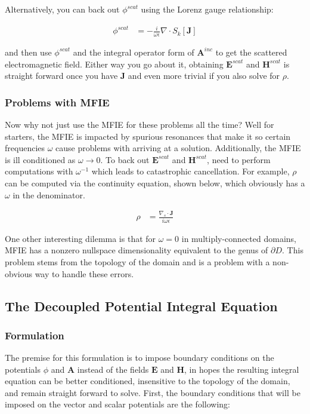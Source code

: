 \documentclass{article}[12pt]
\newcommand{\bvec}[1]{\boldsymbol{#1}}
\begin{document}
	Alternatively, you can back out $\phi^{scat}$ using the Lorenz gauge relationship:
	
	\begin{align*}
	\phi^{scat} &= -\frac{i}{\omega \epsilon} \nabla \cdot S_k[\bvec{J}]
	\end{align*} 
	
	and then use $\phi^{scat}$ and the integral operator form of $\bvec{A}^{inc}$ to get the scattered electromagnetic field. Either way you go about it, obtaining $\bvec{E}^{scat}$ and $\bvec{H}^{scat}$ is straight forward once you have $\bvec{J}$ and even more trivial if you also solve for $\rho$.
	
	


	
	\subsubsection{Problems with MFIE}
	Now why not just use the MFIE for these problems all the time? Well for starters, the MFIE is impacted by spurious resonances that make it so certain frequencies $\omega$ cause problems with arriving at a solution. Additionally, the MFIE is ill conditioned as $\omega \rightarrow 0$. To back out $\bvec{E}^{scat}$ and $\bvec{H}^{scat}$, need to perform computations with $\omega^{-1}$ which leads to catastrophic cancellation. For example, $\rho$ can be computed via the continuity equation, shown below, which obviously has a $\omega$ in the denominator.
	
	\begin{align*}
	\rho &= \frac{\nabla_s \cdot \bvec{J}}{i \omega \epsilon}
	\end{align*}
	
	One other interesting dilemma is that for $\omega = 0$ in multiply-connected domains, MFIE has a nonzero nullspace dimensionality equivalent to the genus of $\partial D$. This problem stems from the topology of the domain and is a problem with a non-obvious way to handle these errors.
	
	
	
	
	\subsection{The Decoupled Potential Integral Equation}
	\subsubsection{Formulation}
	The premise for this formulation is to impose boundary conditions on the potentials $\phi$ and $\bvec{A}$ instead of the fields $\bvec{E}$ and $\bvec{H}$, in hopes the resulting integral equation can be better conditioned, insensitive to the topology of the domain, and remain straight forward to solve. First, the boundary conditions that will be imposed on the vector and scalar potentials are the following:
	
\end{document}
